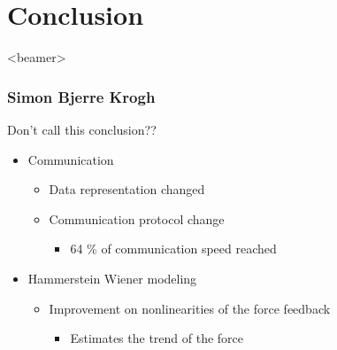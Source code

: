 \section{Conclusion}
\begin{frame}<beamer>
\frametitle{Simon Bjerre Krogh}
\tableofcontents[currentsection]
\end{frame}


\begin{frame}{Don't call this conclusion??}{}

  \begin{itemize}
    \item<1-> Communication 
    \begin{itemize}
    	\item Data representation changed 
    	\item Communication protocol change 
    	\begin{itemize}
    	\item 64 \% of communication speed reached 
     	\end{itemize}
     \end{itemize}
    \item Hammerstein Wiener modeling 
    \begin{itemize}
    	\item Improvement on nonlinearities of the force feedback
    	\begin{itemize}
    		\item Estimates the trend of the force 
    	\end{itemize}
    \end{itemize}
  \end{itemize}


\end{frame}



